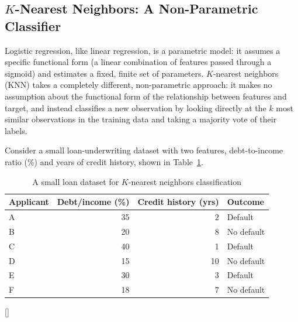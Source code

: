 \documentclass[../ai_in_finance]{subfiles}
\begin{document}
\subsection{$K$-Nearest Neighbors: A Non-Parametric Classifier}

Logistic regression, like linear regression, is a parametric model: it assumes a specific functional form (a linear combination of features passed through a sigmoid) and estimates a fixed, finite set of parameters. $K$-nearest neighbors (KNN) takes a completely different, non-parametric approach: it makes no assumption about the functional form of the relationship between features and target, and instead classifies a new observation by looking directly at the $k$ most similar observations in the training data and taking a majority vote of their labels.

Consider a small loan-underwriting dataset with two features, debt-to-income ratio (\%) and years of credit history, shown in Table~\ref{tab:knn_data}.

\begin{table}[htbp]
\centering
\begin{lrbox}{\bookmeasuredbox}
\begin{tabular}{lrrl}
\toprule
Applicant & Debt/income (\%) & Credit history (yrs) & Outcome \\
\midrule
A & 35 & 2  & Default \\
B & 20 & 8  & No default \\
C & 40 & 1  & Default \\
D & 15 & 10 & No default \\
E & 30 & 3  & Default \\
F & 18 & 7  & No default \\
\bottomrule
\end{tabular}
\end{lrbox}
\ifdim\wd\bookmeasuredbox<0.65\linewidth
\setlength{\bookcapwidth}{0.65\linewidth}
\else
\setlength{\bookcapwidth}{\wd\bookmeasuredbox}
\fi
{}[\bookcapwidth]{
\usebox{\bookmeasuredbox}
}{
\caption{A small loan dataset for $K$-nearest neighbors classification}
\label{tab:knn_data}
}
\end{table}
\end{document}
